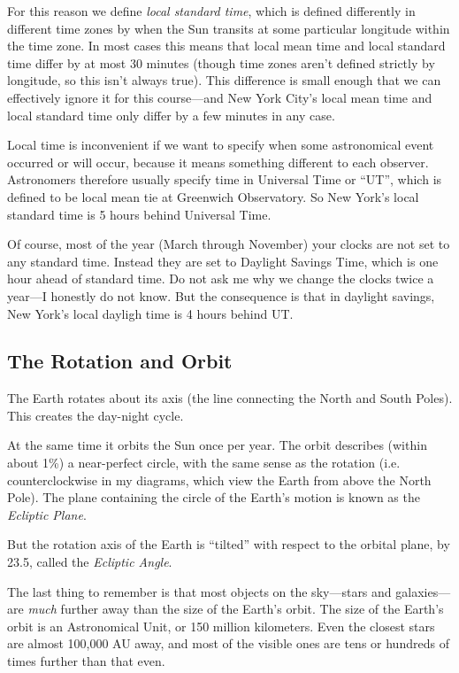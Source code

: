 \documentclass[12pt, preprint]{aastex}
\begin{document}
For this reason we define {\it local standard time}, which is defined
differently in different time zones by when the Sun transits at some
particular longitude within the time zone. In most cases this means
that local mean time and local standard time differ by at most 30
minutes (though time zones aren't defined strictly by longitude, so
this isn't always true). This difference is small enough that we can
effectively ignore it for this course---and New York City's local mean
time and local standard time only differ by a few minutes in any case.

Local time is inconvenient if we want to specify when some
astronomical event occurred or will occur, because it means something
different to each observer. Astronomers therefore usually specify time
in Universal Time or ``UT'', which is defined to be local mean tie at
Greenwich Observatory. So New York's local standard time is 5 hours
behind Universal Time.

Of course, most of the year (March through November) your clocks are
not set to any standard time. Instead they are set to Daylight Savings
Time, which is one hour ahead of standard time. Do not ask me why we
change the clocks twice a year---I honestly do not know. But the
consequence is that in daylight savings, New York's local dayligh time
is 4 hours behind UT.

\subsection{The Rotation and Orbit}

The Earth rotates about its axis (the line connecting the North and
South Poles). This creates the day-night cycle.

At the same time it orbits the Sun once per year. The orbit describes
(within about 1\%) a near-perfect circle, with the same sense as the
rotation (i.e.  counterclockwise in my diagrams, which view the Earth
from above the North Pole). The plane containing the circle of the
Earth's motion is known as the {\it Ecliptic Plane}.

But the rotation axis of the Earth is ``tilted'' with respect to the
orbital plane, by 23.5\degree, called the {\it Ecliptic Angle}.

The last thing to remember is that most objects on the sky---stars and
galaxies---are {\it much} further away than the size of the Earth's
orbit. The size of the Earth's orbit is an Astronomical Unit, or
150 million kilometers. Even the closest stars are almost 100,000 AU
away, and most of the visible ones are tens or hundreds of times
further than that even. 
\end{document}
